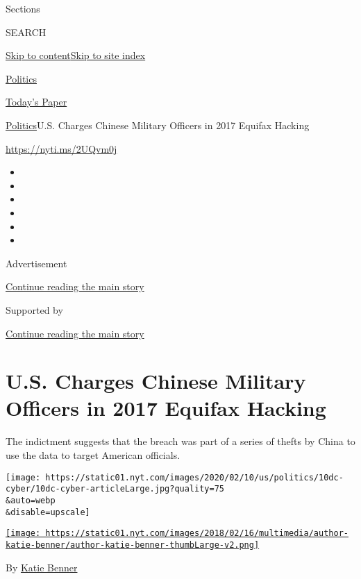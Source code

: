 Sections

SEARCH

\protect\hyperlink{site-content}{Skip to
content}\protect\hyperlink{site-index}{Skip to site index}

\href{https://www.nytimes.com/section/politics}{Politics}

\href{https://myaccount.nytimes.com/auth/login?response_type=cookie\&client_id=vi}{}

\href{https://www.nytimes.com/section/todayspaper}{Today's Paper}

\href{/section/politics}{Politics}\textbar{}U.S. Charges Chinese
Military Officers in 2017 Equifax Hacking

\href{https://nyti.ms/2UQvm0j}{https://nyti.ms/2UQvm0j}

\begin{itemize}
\item
\item
\item
\item
\item
\item
\end{itemize}

Advertisement

\protect\hyperlink{after-top}{Continue reading the main story}

Supported by

\protect\hyperlink{after-sponsor}{Continue reading the main story}

\hypertarget{us-charges-chinese-military-officers-in-2017-equifax-hacking}{%
\section{U.S. Charges Chinese Military Officers in 2017 Equifax
Hacking}\label{us-charges-chinese-military-officers-in-2017-equifax-hacking}}

The indictment suggests that the breach was part of a series of thefts
by China to use the data to target American officials.

\texttt{[image: https://static01.nyt.com/images/2020/02/10/us/politics/10dc-cyber/10dc-cyber-articleLarge.jpg?quality=75\\\&auto=webp\\\&disable=upscale]}

\href{https://www.nytimes.com/by/katie-benner}{\texttt{[image: https://static01.nyt.com/images/2018/02/16/multimedia/author-katie-benner/author-katie-benner-thumbLarge-v2.png]}}

By \href{https://www.nytimes.com/by/katie-benner}{Katie Benner}

